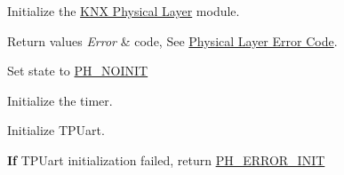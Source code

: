 Initialize the \hyperlink{group___k_n_x___p_h}{K\+NX Physical Layer} module. 


\begin{DoxyRetVals}{Return values}
{\em Error} & code, See \hyperlink{group___p_h___error___code}{Physical Layer Error Code}. \\
\hline
\end{DoxyRetVals}
Set state to \hyperlink{group___k_n_x___p_h___sup___exported___types_gga5b665a94bef912fbfbea7cc949ed0e49a329f30393c5729b777643b93478de68c}{P\+H\+\_\+\+N\+O\+I\+N\+IT}

Initialize the timer.

Initialize T\+P\+Uart.

{\bfseries If} T\+P\+Uart initialization failed, return \hyperlink{group___p_h___error___code_ga15fbdf4edfc98283ef0f1b7c2fc0a47b}{P\+H\+\_\+\+E\+R\+R\+O\+R\+\_\+\+I\+N\+IT} 